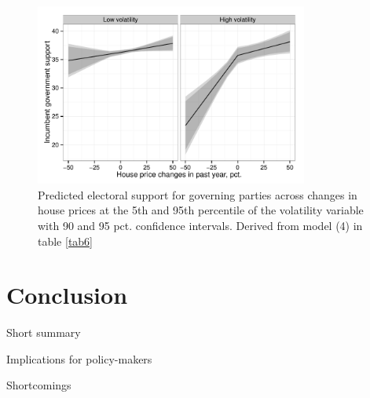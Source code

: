 \documentclass[12pt,a4paper]{article}
\begin{document}
\begin{figure}[htbp]
	\includegraphics[width=0.8\textwidth]{../figures/volaposnegplot}
	\centering
	\caption{Predicted electoral support for governing parties across changes in house prices at the 5th and 95th percentile of the volatility variable with 90 and 95 pct. confidence intervals. Derived from model (4) in table \ref{tab6}}
	\label{volaposneg}
\end{figure}




\section{Conclusion}
Short summary

Implications for policy-makers

Shortcomings









\clearpage

\singlespacing



\end{document}
